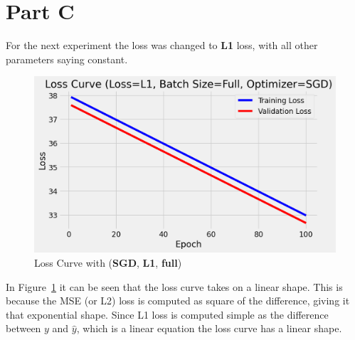 \newpage
\section{Part C}
\label{sec:sec_c}
For the next experiment the loss was changed to \textbf{L1} loss, with all other parameters saying constant. 

\begin{figure}[htpb]
	\centering
	\includegraphics[width=\columnwidth]{figures/c_loss.png}
	\caption{Loss Curve with (\textbf{SGD}, \textbf{L1}, \textbf{full})}
	\label{fig:c loss}
\end{figure}


In Figure~\ref{fig:c loss} it can be seen that the loss curve takes on a linear shape. This is because the MSE (or L2) loss is computed as square of the difference, giving it that exponential shape. Since L1 loss is computed simple as the difference between $y$ and $\hat{y}$, which is a linear equation the loss curve has a linear shape.